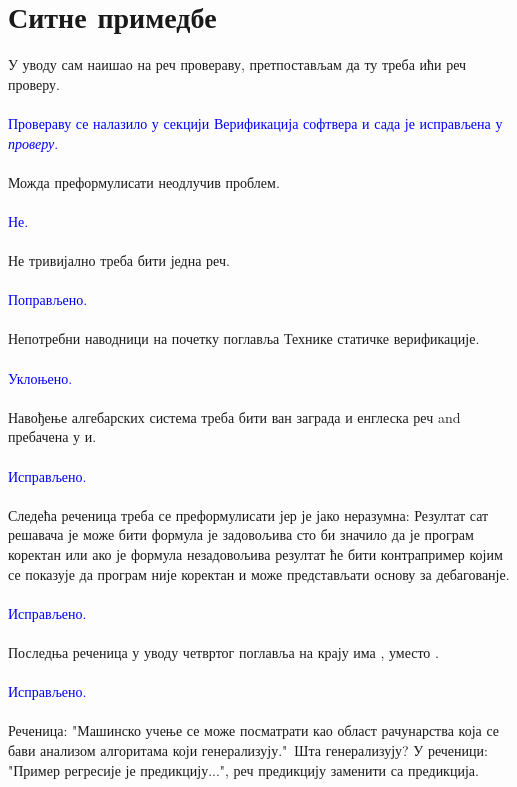 \documentclass[a4paper]{report}
\newcommand{\odgovor}[1]{\textcolor{blue}{#1}}
\begin{document}
\section{Ситне примедбе}
У уводу сам наишао на реч провераву, претпостављам да ту треба ићи реч проверу.
    \\\\
    \odgovor{Провераву се налазило у секцији Верификација софтвера и сада је исправљена у \emph{проверу}.} 
	\\\\
Можда преформулисати неодлучив проблем.
    \\\\
    \odgovor{Не.} 
	\\\\
Не тривијално треба бити једна реч.
    \\\\
    \odgovor{Поправљено.} 
	\\\\
Непотребни наводници на почетку поглавља Технике статичке верификације.
    \\\\
    \odgovor{Уклоњено.} 
	\\\\
Навођење алгебарских система треба бити ван заграда и енглеска реч and пребачена у и.
    \\\\
    \odgovor{Исправљено.} 
	\\\\
Следећа реченица треба се преформулисати јер је јако неразумна: Резултат сат решавача је може бити формула је задовољива сто би значило да је програм коректан или ако је формула незадовољива резултат ће бити контрапример којим се показује да програм није коректан и може представљати основу за дебагованје. 
    \\\\
    \odgovor{Исправљено.} 
	\\\\
Последња реченица у уводу четвртог поглавља на крају има , уместо .
    \\\\
    \odgovor{Исправљено.} 
	\\\\
Реченица: "Машинско учење се може посматрати као област рачунарства која се бави анализом алгоритама који генерализују."\ Шта генерализују?
У реченици: "Пример регресије је предикцију...", реч предикцију заменити са предикција.
\end{document}
